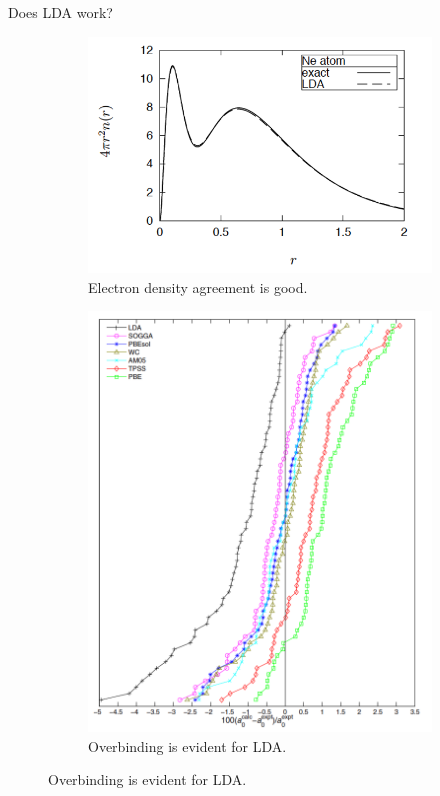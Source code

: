 \documentclass[aspectratio=169]{beamer}
\begin{document}
    \begin{frame}{Does LDA work?}

        \begin{figure}
            \centering
            \begin{subfigure}{0.6\textwidth}
                \includegraphics[width=\linewidth]{lectures/figures/5_radial_density_Ne.png}
                \caption{Electron density agreement is good.}
            \end{subfigure}
            \begin{subfigure}{0.35\textwidth}
                \includegraphics[width=\linewidth]{lectures/figures/5_bond_lengths.png}
                \caption{Overbinding is evident for LDA.\cite{haasCalculationLatticeConstant2009}}
            \end{subfigure}
        \end{figure}

    \end{frame}
\end{document}
